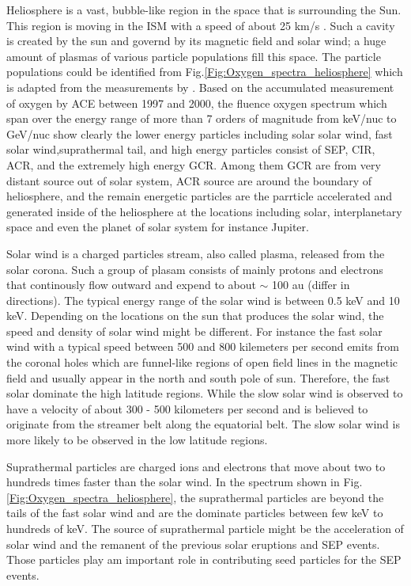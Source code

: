 Heliosphere is a vast, bubble-like region in the space that is surrounding the Sun. This region is moving in the \ac{ISM} with a speed of about 25 km/s \citep{McComas2015ApJS}. Such a cavity is created by the sun and governd by its magnetic field and solar wind; a huge amount of plasmas of various particle populations fill this space. The particle populations could be identified from Fig.\ref{Fig:Oxygen_spectra_heliosphere} which is adapted from the measurements by \citet{Mewaldt-2001}. Based on the accumulated measurement of oxygen by \ac{ACE} between 1997 and 2000, the fluence oxygen spectrum which span over the energy range of more than 7 orders of magnitude from keV/nuc to GeV/nuc show clearly the lower energy particles including solar solar wind, fast solar wind,suprathermal tail, and high energy particles consist of \ac{SEP}, \ac{CIR}, \ac{ACR}, and the extremely high energy \ac{GCR}. 
Among them \acs{GCR} are from very distant source out of solar system, \acs{ACR} source are around the boundary of heliosphere, and the remain energetic particles are the parrticle accelerated and generated inside of the heliosphere at the locations including solar, interplanetary space and even the planet of solar system for instance Jupiter.

Solar wind is a charged particles stream, also called plasma, released from the solar corona. Such a group of plasam consists of mainly protons and electrons that continously flow outward and expend to about $\sim$ 100 au (differ in directions). The typical energy range of the solar wind is between 0.5 keV and 10 keV. Depending on the locations on the sun that produces the solar wind, the speed and density of solar wind might be different. For instance the fast solar wind with a typical speed between 500 and 800 kilemeters per second emits from the coronal holes which are funnel-like regions of open field lines in the magnetic field and usually appear in the north and south pole of sun. Therefore, the fast solar dominate the high latitude regions. While the slow solar wind is observed to have a velocity of about 300 - 500 kilometers per second and is believed to originate from the streamer belt along the equatorial belt. The slow solar wind is more likely to be observed in the low latitude regions.


Suprathermal particles are charged ions and electrons that move about two to hundreds times faster than the solar wind. In the spectrum shown in Fig.\ref{Fig:Oxygen_spectra_heliosphere}, the suprathermal particles are beyond the tails of the fast solar wind and are the dominate particles between few keV to hundreds of keV. The source of suprathermal particle might be the acceleration of solar wind and the remanent of the previous solar eruptions and \ac{SEP} events. Those particles play am important role in contributing seed particles for the \acl{SEP} events.

